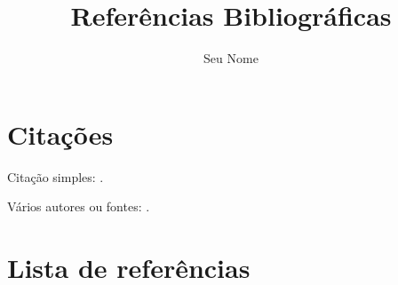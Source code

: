 \documentclass[12pt, a4paper]{article}
\title{Referências Bibliográficas}
\author{Seu Nome}
\date{}
\begin{document}
\maketitle

\section{Citações}
Citação simples: \cite{knuth1984}.

Vários autores ou fontes: \cite{knuth1984, lamport1994}.

\section{Lista de referências}
\printbibliography
\end{document}
